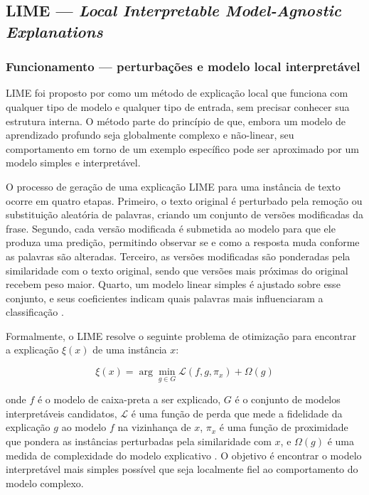 \documentclass[
    12pt,                %
    openright,           %
    oneside,             %
    a4paper,             %
    english,             %
    brazil               %
]{abntex2}
\begin{document}
\subsection{LIME — \textit{Local Interpretable Model-Agnostic Explanations}}
\label{subsec:lime}

\subsubsection{Funcionamento — perturbações e modelo local interpretável}
\label{subsubsec:lime_funcionamento}

LIME foi proposto por  como um método de 
explicação local que funciona com qualquer tipo de modelo e qualquer 
tipo de entrada, sem precisar conhecer sua estrutura interna. O método 
parte do princípio de que, embora um modelo de aprendizado profundo 
seja globalmente complexo e não-linear, seu comportamento em torno 
de um exemplo específico pode ser aproximado por um modelo simples 
e interpretável.

O processo de geração de uma explicação LIME para uma instância de 
texto ocorre em quatro etapas. Primeiro, o texto original é perturbado 
pela remoção ou substituição aleatória de palavras, criando um conjunto 
de versões modificadas da frase. Segundo, cada versão modificada é 
submetida ao modelo para que ele produza uma predição, permitindo 
observar se e como a resposta muda conforme as palavras são alteradas. 
Terceiro, as versões modificadas são ponderadas pela similaridade com 
o texto original, sendo que versões mais próximas do original recebem 
peso maior. Quarto, um modelo linear simples é ajustado sobre esse 
conjunto, e seus coeficientes indicam quais palavras mais influenciaram 
a classificação \cite{ribeiro2016}.

Formalmente, o LIME resolve o seguinte problema de otimização 
para encontrar a explicação $\xi(x)$ de uma instância $x$:

\begin{equation}
\xi(x) = \arg\min_{g \in G} \mathcal{L}(f, g, \pi_x) + \Omega(g)
\end{equation}

onde $f$ é o modelo de caixa-preta a ser explicado, $G$ é o 
conjunto de modelos interpretáveis candidatos, $\mathcal{L}$ é 
uma função de perda que mede a fidelidade da explicação $g$ ao 
modelo $f$ na vizinhança de $x$, $\pi_x$ é uma função de 
proximidade que pondera as instâncias perturbadas pela 
similaridade com $x$, e $\Omega(g)$ é uma medida de 
complexidade do modelo explicativo \cite{ribeiro2016}. O 
objetivo é encontrar o modelo interpretável mais simples 
possível que seja localmente fiel ao comportamento do modelo 
complexo.
\end{document}
